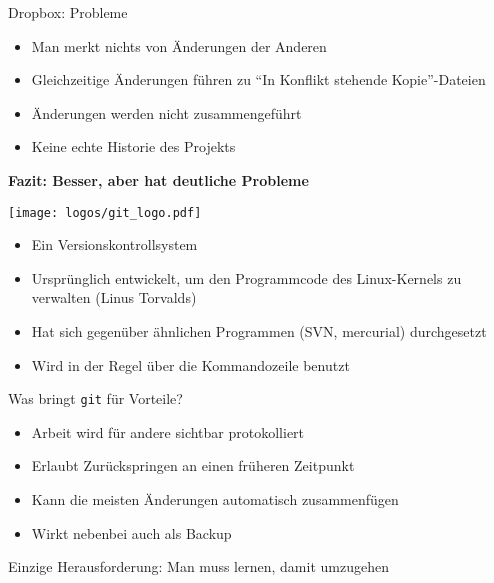 
\begin{frame}{Dropbox: Probleme}
  \centering

  \begin{itemize}
    \item Man merkt nichts von Änderungen der Anderen
    \item Gleichzeitige Änderungen führen zu \enquote{In Konflikt stehende Kopie}-Dateien
    \item Änderungen werden nicht zusammengeführt
    \item Keine echte Historie des Projekts
  \end{itemize}
  \textbf{\Large Fazit: Besser, aber hat deutliche Probleme}
\end{frame}


\begin{frame}
    \centering
    \texttt{[image: logos/git\_logo.pdf]}

    \vspace{1em}

    \begin{itemize}
      \item Ein Versionskontrollsystem
      \item Ursprünglich entwickelt, um den Programmcode des Linux-Kernels zu verwalten (Linus Torvalds)
      \item Hat sich gegenüber ähnlichen Programmen (SVN, mercurial) durchgesetzt
      \item Wird in der Regel über die Kommandozeile benutzt
    \end{itemize}
\end{frame}

\begin{frame}{Was bringt \texttt{git} für Vorteile?}
  \begin{itemize}
    \item Arbeit wird für andere sichtbar protokolliert
    \item Erlaubt Zurückspringen an einen früheren Zeitpunkt
    \item Kann die meisten Änderungen automatisch zusammenfügen
    \item Wirkt nebenbei auch als Backup
  \end{itemize}
  Einzige Herausforderung: Man muss lernen, damit umzugehen
\end{frame}

